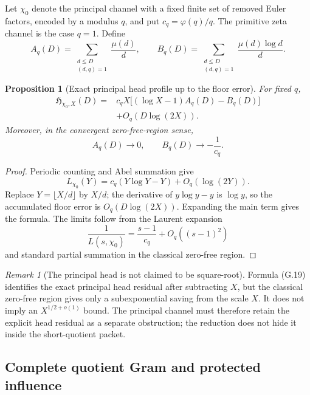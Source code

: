 \documentclass[11pt]{article}
\newtheorem{proposition}[theorem]{Proposition}
\theoremstyle{definition}
\theoremstyle{remark}
\newtheorem{remark}[theorem]{Remark}
\begin{document}
Let \(\chi_0\) denote the principal channel with a fixed finite set of removed Euler factors, encoded by a modulus \(q\), and put
\(c_q=\varphi(q)/q\).  The primitive zeta channel is the case \(q=1\).  Define
\[
 A_q(D)=\sum_{\substack{d\le D\\(d,q)=1}}\frac{\mu(d)}d,
 \qquad
 B_q(D)=\sum_{\substack{d\le D\\(d,q)=1}}
         \frac{\mu(d)\log d}{d}.
\]

\begin{proposition}[Exact principal head profile up to the floor error]
\label{prop:grhouter-principal-head}
For fixed \(q\),
\[
 \boxed{
 \begin{aligned}
 \mathfrak H_{\chi_0,X}(D)
 ={}&c_qX\bigl[(\log X-1)A_q(D)-B_q(D)\bigr]
 \\
 &+O_q(D\log(2X)).
 \end{aligned}}
 \tag{G.19}
\]
Moreover, in the convergent zero-free-region sense,
\[
 A_q(D)\longrightarrow0,
 \qquad
 B_q(D)\longrightarrow-\frac1{c_q}.
\]
\end{proposition}

\begin{proof}
Periodic counting and Abel summation give
\[
 L_{\chi_0}(Y)
 =c_q(Y\log Y-Y)+O_q(\log(2Y)).
\]
Replace \(Y=\lfloor X/d\rfloor\) by \(X/d\); the derivative of
\(y\log y-y\) is \(\log y\), so the accumulated floor error is
\(O_q(D\log(2X))\).  Expanding the main term gives the formula.  The limits
follow from the Laurent expansion
\[
 \frac1{L(s,\chi_0)}=\frac{s-1}{c_q}+O_q((s-1)^2)
\]
and standard partial summation in the classical zero-free region.
\end{proof}

\begin{remark}[The principal head is not claimed to be square-root]
Formula \textup{(G.19)} identifies the exact principal head residual after
subtracting \(X\), but the classical zero-free region gives only a
subexponential saving from the scale \(X\).  It does not imply an
\(X^{1/2+o(1)}\) bound.  The principal channel must therefore retain the
explicit head residual as a separate obstruction; the reduction does not hide it
inside the short-quotient packet.
\end{remark}

\subsection{Complete quotient Gram and protected influence}
\label{subsec:grhouter-quotient-Gram}
\end{document}
